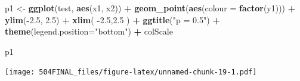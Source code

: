 \documentclass[]{article}
\newenvironment{Shaded}{\begin{snugshade}}{\end{snugshade}}
\newcommand{\KeywordTok}[1]{\textcolor[rgb]{0.13,0.29,0.53}{\textbf{#1}}}
\newcommand{\DataTypeTok}[1]{\textcolor[rgb]{0.13,0.29,0.53}{#1}}
\newcommand{\FloatTok}[1]{\textcolor[rgb]{0.00,0.00,0.81}{#1}}
\newcommand{\StringTok}[1]{\textcolor[rgb]{0.31,0.60,0.02}{#1}}
\newcommand{\OperatorTok}[1]{\textcolor[rgb]{0.81,0.36,0.00}{\textbf{#1}}}
\newcommand{\NormalTok}[1]{#1}
\begin{document}
\begin{Shaded}
\begin{Highlighting}[]
\NormalTok{p1 <-}\StringTok{ }\KeywordTok{ggplot}\NormalTok{(test, }\KeywordTok{aes}\NormalTok{(x1, x2)) }\OperatorTok{+}\StringTok{ }\KeywordTok{geom_point}\NormalTok{(}\KeywordTok{aes}\NormalTok{(}\DataTypeTok{colour =} \KeywordTok{factor}\NormalTok{(y1))) }\OperatorTok{+}
\StringTok{ }\KeywordTok{ylim}\NormalTok{(}\OperatorTok{-}\FloatTok{2.5}\NormalTok{, }\FloatTok{2.5}\NormalTok{) }\OperatorTok{+}\StringTok{ }\KeywordTok{xlim}\NormalTok{( }\OperatorTok{-}\FloatTok{2.5}\NormalTok{,}\FloatTok{2.5}\NormalTok{ ) }\OperatorTok{+}\StringTok{ }\KeywordTok{ggtitle}\NormalTok{(}\StringTok{"p = 0.5"}\NormalTok{) }\OperatorTok{+}
\StringTok{ }\KeywordTok{theme}\NormalTok{(}\DataTypeTok{legend.position=}\StringTok{"bottom"}\NormalTok{) }\OperatorTok{+}\StringTok{ }\NormalTok{colScale}
\end{Highlighting}
\end{Shaded}

\begin{Shaded}
\begin{Highlighting}[]
\NormalTok{p1}
\end{Highlighting}
\end{Shaded}

\texttt{[image: 504FINAL\_files/figure-latex/unnamed-chunk-19-1.pdf]}
\end{document}
